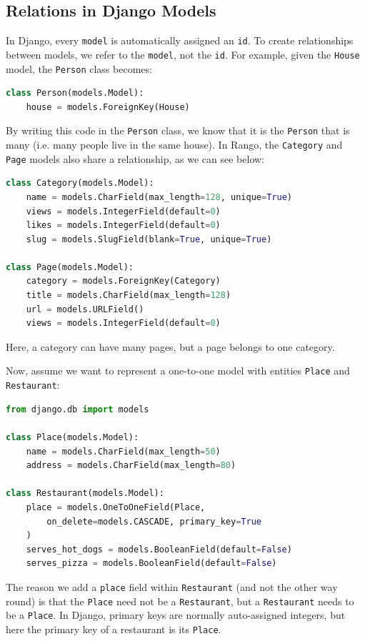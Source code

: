 \documentclass[a4paper, openany]{memoir}
\begin{document}
\subsection{Relations in Django Models}
In Django, every \texttt{model} is automatically assigned an \texttt{id}. To create relationships between models, we refer to the \texttt{model}, not the \texttt{id}. For example, given the \texttt{House} model, the \texttt{Person} class becomes:
\begin{lstlisting}[language=python]
class Person(models.Model):
    house = models.ForeignKey(House)
\end{lstlisting}
By writing this code in the \texttt{Person} class, we know that it is the \texttt{Person} that is many (i.e. many people live in the same house). In Rango, the \texttt{Category} and \texttt{Page} models also share a relationship, as we can see below:
\begin{lstlisting}[language=python]
class Category(models.Model):
    name = models.CharField(max_length=128, unique=True)
    views = models.IntegerField(default=0)
    likes = models.IntegerField(default=0)
    slug = models.SlugField(blank=True, unique=True)

class Page(models.Model):
    category = models.ForeignKey(Category)
    title = models.CharField(max_length=128)
    url = models.URLField()
    views = models.IntegerField(default=0)
\end{lstlisting}
Here, a category can have many pages, but a page belongs to one category.

\noindent Now, assume we want to represent a one-to-one model with entities \texttt{Place} and \texttt{Restaurant}:
\begin{lstlisting}[language=python]
from django.db import models

class Place(models.Model):
    name = models.CharField(max_length=50)
    address = models.CharField(max_length=80)

class Restaurant(models.Model):
    place = models.OneToOneField(Place,
        on_delete=models.CASCADE, primary_key=True
    )
    serves_hot_dogs = models.BooleanField(default=False)
    serves_pizza = models.BooleanField(default=False) 
\end{lstlisting}
The reason we add a \texttt{place} field within \texttt{Restaurant} (and not the other way round) is that the \texttt{Place} need not be a \texttt{Restaurant}, but a \texttt{Restaurant} needs to be a \texttt{Place}. In Django, primary keys are normally auto-assigned integers, but here the primary key of a restaurant is its \texttt{Place}.
\end{document}
